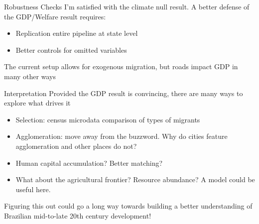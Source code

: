 \documentclass[aspectratio=169]{beamer}
\begin{document}
\begin{frame}{Robustness Checks}
I'm satisfied with the climate null result. 
A better defense of the GDP/Welfare result requires:
\begin{itemize}
    \item Replication entire pipeline at state level
    \item Better controls for omitted variables
\end{itemize}
The current setup allows for exogenous migration, but roads impact GDP in many other ways
\end{frame}


\begin{frame}{Interpretation}
Provided the GDP result is convincing, there are many ways to explore what drives it
\begin{itemize}
    \item Selection: census microdata comparison of types of migrants
    \item Agglomeration: move away from the buzzword. Why do cities feature agglomeration and other places do not?
    \item Human capital accumulation? Better matching?
    \item What about the agricultural frontier? Resource abundance? A model could be useful here.
\end{itemize}
Figuring this out could go a long way towards building a better understanding of Brazilian mid-to-late 20th century development!
\end{frame}
\end{document}
